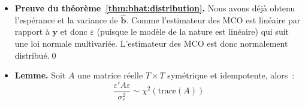 \documentclass[10pt,a4paper]{article}
\theoremstyle{definition}
\renewcommand{\newline}{\unskip\par\vspace{1.5pt}}
\begin{document}
\begin{notes}

  \begin{itemize}

  \item \textbf{Preuve du théorème~\ref{thm:bhat:distribution}.} Nous avons déjà obtenu l'espérance et la variance de $\hat{\mathbf b}$. Comme l'estimateur des MCO est linéaire par rapport à $\mathbf y$ et donc $\varepsilon$ (puisque le modèle de la nature est linéaire) qui suit une loi normale multivariée. L'estimateur des MCO est donc normalement distribué.\qed\newline

  \item \textbf{Lemme.} Soit $A$ une matrice réelle $T\times T$ symétrique et idempotente, alors~:
       \[
         \frac{\varepsilon' A \varepsilon}{\sigma_{\varepsilon}^2} \sim \chi^2\left(\mathrm{trace}(A)\right)
       \]
       \medskip


\end{itemize}
\end{notes}
\end{document}
